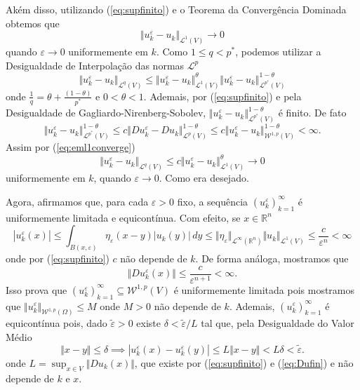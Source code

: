 \documentclass[a4paper, 11pt]{book}
\theoremstyle{definition}
\newcommand{\bR}{\mathbb{R}}
\newcommand{\cL}{\mathcal{L}}
\newcommand{\cW}{\mathcal{W}}
\begin{document}
\begin{prf}
\[    \]
    Akém disso, utilizando (\ref{eq:supfinito}) e o Teorema da Convergência Dominada obtemos que
    \begin{equation} \label{eq:eml1converge}
        \Vert u_k^\varepsilon - u_k \Vert_{\cL^1(V)} \to 0
    \end{equation}
    quando $\varepsilon \to 0$ uniformemente em $k$. Como $1 \leqslant q < p^*$, podemos utilizar a Desigualdade de Interpolação das normas $\cL^p$
    \[
        \Vert u_k^\varepsilon - u_k \Vert_{\cL^q(V)} \leqslant \Vert u_k^\varepsilon - u_k \Vert_{\cL^1(V)}^\theta \Vert u_k^\varepsilon - u_k \Vert_{\cL^{p^*}(V)}^{1- \theta}
    \]
    onde $\frac{1}{q} = \theta + \frac{(1 - \theta)}{p^*}$ e $0 < \theta < 1$.
    Ademais, por (\ref{eq:supfinito}) e pela Desigualdade de Gagliardo-Nirenberg-Sobolev, $\Vert u_k^\varepsilon - u_k \Vert_{\cL^{p^*}(V)}^{1- \theta}$ é finito. De fato
    \[
        \Vert u_k^\varepsilon - u_k \Vert_{\cL^{p^*}(V)}^{1 - \theta} \leqslant c \Vert Du_k^\varepsilon - Du_k \Vert_{\cL^p(V)}^{1 - \theta} \leqslant c \Vert u_k^\varepsilon - u_k \Vert_{\cW^{1,p}(V)}^{1- \theta} < \infty. 
    \]
    Assim por (\ref{eq:eml1converge})
    \[
        \Vert u_k^\varepsilon - u_k \Vert_{\cL^q(V)} \leqslant c \Vert u_k^\varepsilon - u_k \Vert_{\cL^1(V)}^\theta \to 0
    \]
    uniformemente em $k$, quando $\varepsilon \to 0$. Como era desejado.

    Agora, afirmamos que, para cada $\varepsilon > 0$ fixo, a sequência $(u_k^\varepsilon)_{k=1}^\infty$ é uniformemente limitada e equicontínua.
    Com efeito, se $x \in \bR^n$
    \begin{equation} \label{eq:ufin}
        |u_k^\varepsilon(x)| \leqslant \int_{B(x,\varepsilon)} \eta_\varepsilon (x - y) |u_k(y)| \,dy \leqslant \Vert \eta_\varepsilon \Vert_{\cL^\infty(\bR^n)} \Vert u_k \Vert_{\cL^1(V)} \leqslant \frac{c}{\varepsilon^n} < \infty
    \end{equation}
    onde por (\ref{eq:supfinito}) $c$ não depende de $k$. De forma análoga, mostramos que
    \begin{equation} \label{eq:Dufin}
        \Vert Du_k^\varepsilon(x) \Vert  \leqslant \frac{c}{\varepsilon^{n+1}} < \infty.
    \end{equation}
    Isso prova que $(u_k^\varepsilon)_{k=1}^\infty \subseteq \cW^{1,p}(V)$ é uniformemente limitada pois mostramos que $\Vert u_k^\varepsilon \Vert_{\cW^{1,p}(\Omega)}\leqslant M$ onde $M > 0$ não depende de $k$.
    Ademais, $(u_k^\varepsilon)_{k=1}^\infty$ é equicontínua pois, dado $\tilde\varepsilon > 0$ existe $\delta < \tilde\varepsilon / L$ tal que, pela Desigualdade do Valor Médio
    \[
        \Vert x - y \Vert \leqslant \delta \implies |u_k^\varepsilon(x) - u_k^\varepsilon(y)| \leqslant L \Vert x - y \Vert < L \delta < \tilde\varepsilon.
    \]
    onde $L = \sup_{x \in V} \Vert Du_k(x) \Vert$, que existe por (\ref{eq:supfinito}) e (\ref{eq:Dufin}) e não depende de $k$ e $x$.


\end{prf}
\end{document}
